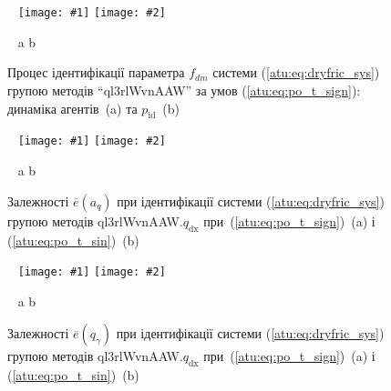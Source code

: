 \documentclass[14pt,handout,utf8]{beamer}
\newcommand{\ABlbl}{%
  \vspace{-2.7ex}
  \begin{center}
    ~ \hfill a \hfill\hfill b \hfill ~
  \end{center}
  \vspace{-2.0ex}
}
\newcommand{\PicDouble}[2]{%
 \begin{center}
    ~ \hfill
    \texttt{[image: \#1]}
    \hfill
    \texttt{[image: \#2]}
    \hfill ~
  \end{center}
  \ABlbl
}
\newcommand{\PicDoubleS}[2]{%
 \begin{center}
    ~ \hfill
    \texttt{[image: \#1]}
    \hfill
    \texttt{[image: \#2]}
    \hfill ~
  \end{center}
  \ABlbl
}
\begin{document}
\begin{frame}
  \frametitle{~}

  \begin{figure}[htb!]
    \PicDouble{../p5/p/cha/fric/ql3rlWvnAAW/fric_id-p_t_pi_ql3rlWvnAAW_sign.png}{../p5/p/cha/fric/ql3rlWvnAAW/fric_id-p_t_p_ql3rlWvnAAW_sign.png}
    \caption{
      Процес ідентифікації параметра $f_{dm}$ системи (\ref{atu:eq:dryfric_sys}) групою методів ``ql3rlWvnAAW''
      за умов (\ref{atu:eq:po_t_sign}): динаміка агентів~(a) та $p_\mathrm{id}$~(b)
    }
    \label{atu:f:fric_id_ql3rlWvnAAW_q_dx_sign}
  \end{figure}

  \begin{figure}[htb!]
    \PicDoubleS{../p5/p/cha/fric/ql3rlWvnAAW/fric_id-p_a_q_sign.png}{../p5/p/cha/fric/ql3rlWvnAAW/fric_id-p_a_q_sin.png}
    \caption{Залежності $\overline{e}(a_q)$ при ідентифікації системи (\ref{atu:eq:dryfric_sys}) групою методів ql3rlWvnAAW.$q_\mathrm{dx} $ при~(\ref{atu:eq:po_t_sign})~(a) і (\ref{atu:eq:po_t_sin})~(b)}
    \label{atu:f:fric_a_q_ql3rlWvnAAW_q_dx}
  \end{figure}

  \begin{figure}[htb!]
    \PicDoubleS{../p5/p/cha/fric/ql3rlWvnAAW/fric_id-p_q_gamma_sign.png}{../p5/p/cha/fric/ql3rlWvnAAW/fric_id-p_q_gamma_sin.png}
    \caption{Залежності $\overline{e}(q_\gamma)$ при ідентифікації системи (\ref{atu:eq:dryfric_sys}) групою методів ql3rlWvnAAW.$q_\mathrm{dx} $ при~(\ref{atu:eq:po_t_sign})~(a) і (\ref{atu:eq:po_t_sin})~(b)}
    \label{atu:f:fric_q_gamma_ql3rlWvnAAW_q_dx}
  \end{figure}


\end{frame}





\end{document}
